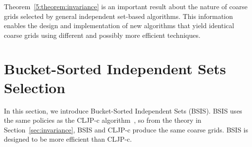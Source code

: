 \documentclass{elsart}
\begin{document}
Theorem~\ref{5:theorem:invariance} is an important result about the
nature of coarse grids selected by general independent set-based
algorithms. This information enables the design and implementation of
new algorithms that yield identical coarse grids using different and
possibly more efficient techniques.

\section{Bucket-Sorted Independent Sets Selection}
\label{sec:bsis}
In this section, we introduce Bucket-Sorted Independent Sets
(BSIS). BSIS uses the same policies as the CLJP-c
algorithm~\cite{alber-cljpc}, so from the theory in
Section~\ref{sec:invariance}, BSIS and CLJP-c produce the same coarse
grids. BSIS is designed to be more efficient than CLJP-c.
\end{document}
